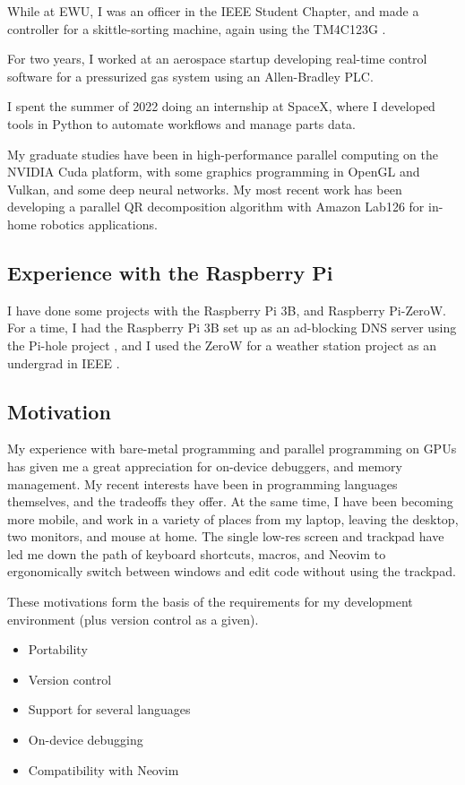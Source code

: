 \documentclass[12pt]{article}
\begin{document}
While at EWU, I was an officer in the IEEE Student Chapter, and made a controller for a skittle-sorting machine, again using the TM4C123G \cite{sorter_project}. 

For two years, I worked at an aerospace startup developing real-time control software for a pressurized gas system using an Allen-Bradley PLC. 

I spent the summer of 2022 doing an internship at SpaceX, where I developed tools in Python to automate workflows and manage parts data.

My graduate studies have been in high-performance parallel computing on the NVIDIA Cuda platform, with some graphics programming in OpenGL and Vulkan, and some deep neural networks. My most recent work has been developing a parallel QR decomposition algorithm with Amazon Lab126 for in-home robotics applications\cite{mixed_precision}.
\subsection{Experience with the Raspberry Pi}
I have done some projects with the Raspberry Pi 3B, and Raspberry Pi-ZeroW. For a time, I had the Raspberry Pi 3B set up as an ad-blocking DNS server using the Pi-hole project \cite{pihole}, and I used the ZeroW for a weather station project as an undergrad in IEEE \cite{weatherstation}.
\subsection{Motivation}
My experience with bare-metal programming and parallel programming on GPUs has given me a great appreciation for on-device debuggers, and memory management. My recent interests have been in programming languages themselves, and the tradeoffs they offer. At the same time, I have been becoming more mobile, and work in a variety of places from my laptop, leaving the desktop, two monitors, and mouse at home. The single low-res screen and trackpad have led me down the path of keyboard shortcuts, macros, and Neovim to ergonomically switch between windows and edit code without using the trackpad. 

These motivations form the basis of the requirements for my development environment (plus version control as a given). 

\begin{itemize}
  \item Portability
  \item Version control
  \item Support for several languages
  \item On-device debugging
  \item Compatibility with Neovim
\end{itemize}
\end{document}
